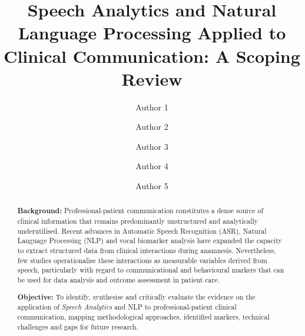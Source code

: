 \documentclass[review,12pt]{elsarticle}
\begin{document}
\begin{frontmatter}

\title{Speech Analytics and Natural Language Processing Applied to
Clinical Communication: A Scoping Review}

\author[inst1]{Author 1}
\author[inst1]{Author 2}
\author[inst2]{Author 3}
\author[inst2]{Author 4}
\author[inst2]{Author 5}


\address[inst1]{[Institution 1 removed for review], Brazil}
\address[inst2]{[Institution 2 removed for review], Brazil}

\begin{abstract}
\textbf{Background:}
Professional-patient communication constitutes a dense source of clinical
information that remains predominantly unstructured and analytically
underutilised. Recent advances in Automatic Speech Recognition (ASR),
Natural Language Processing (NLP) and vocal biomarker analysis have expanded
the capacity to extract structured data from clinical interactions during
anamnesis. Nevertheless, few studies operationalise these interactions as
measurable variables derived from speech, particularly with regard to
communicational and behavioural markers that can be used for data analysis
and outcome assessment in patient care.

\textbf{Objective:}
To identify, synthesise and critically evaluate the evidence on the application
of \textit{Speech Analytics} and NLP to professional-patient clinical
communication, mapping methodological approaches, identified markers, technical
challenges and gaps for future research.


\end{abstract}
\end{frontmatter}
\end{document}
